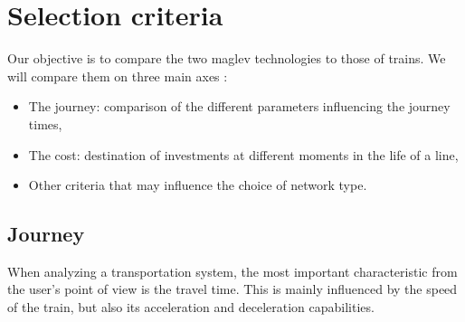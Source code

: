 \documentclass[12pt, a4paper, onecolumn]{article}
\renewcommand{\tab}{\tabto{15px}}
\begin{document}
\pagebreak %
\section{Selection criteria}

\tab Our objective is to compare the two maglev technologies to those of trains. We will compare them on three main axes :
\begin{itemize}
  \item The journey: comparison of the different parameters influencing the journey times,
  \item The cost: destination of investments at different moments in the life of a line,
  \item Other criteria that may influence the choice of network type.
\end{itemize}

\subsection{Journey}
\tab When analyzing a transportation system, the most important characteristic from the user's point of view is the travel time.
This is mainly influenced by the speed of the train, but also its acceleration and deceleration capabilities.
\end{document}
